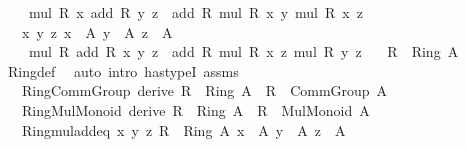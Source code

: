 \begin{isabellebody}
\ \ \ \ mul\ R\ x\ {\isacharparenleft}{\kern0pt}add\ R\ y\ z{\isacharparenright}{\kern0pt}\ {\isacharequal}{\kern0pt}\ add\ R\ {\isacharparenleft}{\kern0pt}mul\ R\ x\ y{\isacharparenright}{\kern0pt}\ {\isacharparenleft}{\kern0pt}mul\ R\ x\ z{\isacharparenright}{\kern0pt}{\isachardoublequoteclose}\isanewline
\ \ \ {\isachardoublequoteopen}{\isasymAnd}x\ y\ z{\isachardot}{\kern0pt}\ {\isasymlbrakk}x\ {\isacharcolon}{\kern0pt}\ A{\isacharsemicolon}{\kern0pt}\ y\ {\isacharcolon}{\kern0pt}\ A{\isacharsemicolon}{\kern0pt}\ z\ {\isacharcolon}{\kern0pt}\ A{\isasymrbrakk}\ {\isasymLongrightarrow}\isanewline
\ \ \ \ mul\ R\ {\isacharparenleft}{\kern0pt}add\ R\ x\ y{\isacharparenright}{\kern0pt}\ z\ {\isacharequal}{\kern0pt}\ add\ R\ {\isacharparenleft}{\kern0pt}mul\ R\ x\ z{\isacharparenright}{\kern0pt}\ {\isacharparenleft}{\kern0pt}mul\ R\ y\ z{\isacharparenright}{\kern0pt}{\isachardoublequoteclose}\isanewline
\ \ \ {\isachardoublequoteopen}R\ {\isacharcolon}{\kern0pt}\ Ring\ A{\isachardoublequoteclose}\isanewline
%
\isadelimproof
\ \ %
\endisadelimproof
%
\isatagproof
{}\isamarkupfalse%
\ Ring{\isacharunderscore}{\kern0pt}def\ \isamarkupfalse%
\ {\isacharparenleft}{\kern0pt}auto\ intro{\isacharcolon}{\kern0pt}\ has{\isacharunderscore}{\kern0pt}typeI\ assms{\isacharparenright}{\kern0pt}%
\endisatagproof
{\isafoldproof}%
%
\isadelimproof
\isanewline
%
\endisadelimproof
\isanewline
{}\isamarkupfalse%
\isanewline
\ \ \ Ring{\isacharunderscore}{\kern0pt}Comm{\isacharunderscore}{\kern0pt}Group\ {\isacharbrackleft}{\kern0pt}derive{\isacharbrackright}{\kern0pt}{\isacharcolon}{\kern0pt}\ {\isachardoublequoteopen}R\ {\isacharcolon}{\kern0pt}\ Ring\ A\ {\isasymLongrightarrow}\ R\ {\isacharcolon}{\kern0pt}\ Comm{\isacharunderscore}{\kern0pt}Group\ A{\isachardoublequoteclose}\isanewline
\ \ \ Ring{\isacharunderscore}{\kern0pt}Mul{\isacharunderscore}{\kern0pt}Monoid\ {\isacharbrackleft}{\kern0pt}derive{\isacharbrackright}{\kern0pt}{\isacharcolon}{\kern0pt}\ {\isachardoublequoteopen}R\ {\isacharcolon}{\kern0pt}\ Ring\ A\ {\isasymLongrightarrow}\ R\ {\isacharcolon}{\kern0pt}\ Mul{\isacharunderscore}{\kern0pt}Monoid\ A{\isachardoublequoteclose}\isanewline
\ \ \ Ring{\isacharunderscore}{\kern0pt}mul{\isacharunderscore}{\kern0pt}add{\isacharunderscore}{\kern0pt}eq{\isacharcolon}{\kern0pt}\ {\isachardoublequoteopen}{\isasymAnd}x\ y\ z{\isachardot}{\kern0pt}\ {\isasymlbrakk}R\ {\isacharcolon}{\kern0pt}\ Ring\ A{\isacharsemicolon}{\kern0pt}\ x\ {\isacharcolon}{\kern0pt}\ A{\isacharsemicolon}{\kern0pt}\ y\ {\isacharcolon}{\kern0pt}\ A{\isacharsemicolon}{\kern0pt}\ z\ {\isacharcolon}{\kern0pt}\ A{\isasymrbrakk}\isanewline

\end{isabellebody}
